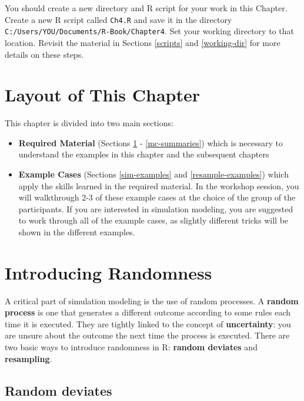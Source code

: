 \documentclass[]{book}
\theoremstyle{definition}
\theoremstyle{definition}
\theoremstyle{definition}
\theoremstyle{remark}
\begin{document}
You should create a new directory and R script for your work in this
Chapter. Create a new R script called \texttt{Ch4.R} and save it in the
directory \texttt{C:/Users/YOU/Documents/R-Book/Chapter4}. Set your
working directory to that location. Revisit the material in Sections
\ref{scripts} and \ref{working-dir} for more details on these steps.

\section*{Layout of This Chapter}\label{layout-of-this-chapter}

This chapter is divided into two main sections:

\begin{itemize}
\item
  \textbf{Required Material} (Sections \ref{randomness} -
  \ref{mc-summaries}) which is necessary to understand the examples in
  this chapter and the subsequent chapters
\item
  \textbf{Example Cases} (Sections \ref{sim-examples} and
  \ref{resample-examples}) which apply the skills learned in the
  required material. In the workshop session, you will walkthrough 2-3
  of these example cases at the choice of the group of the participants.
  If you are interested in simulation modeling, you are suggested to
  work through all of the example cases, as slightly different tricks
  will be shown in the different examples.
\end{itemize}

\section{Introducing Randomness}\label{randomness}

A critical part of simulation modeling is the use of random processes. A
\textbf{random process} is one that generates a different outcome
according to some rules each time it is executed. They are tightly
linked to the concept of \textbf{uncertainty}: you are unsure about the
outcome the next time the process is executed. There are two basic ways
to introduce randomness in R: \textbf{random deviates} and
\textbf{resampling}.

\subsection{Random deviates}\label{random-deviates}
\end{document}
